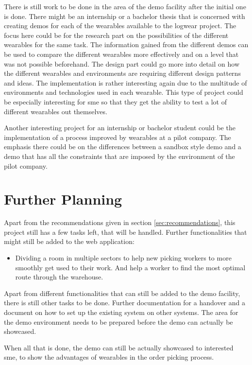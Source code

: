 There is still work to be done in the area of the demo facility after the initial one is done. There might be an internship or a bachelor thesis that is concerned with creating demos for each of the wearables available to the logwear project. The focus here could be for the research part on the possibilities of the different wearables for the same task. The information gained from the different demos can be used to compare the different wearables more effectively and on a level that was not possible beforehand. The design part could go more into detail on how the different wearables and environments are requiring different design patterns and ideas. The implementation is rather interesting again due to the multitude of environments and technologies used in each wearable. This type of project could be especially interesting for \gls{sme} so that they get the ability to test a lot of different wearables out themselves.

Another interesting project for an internship or bachelor student could be the implementation of a process improved by wearables at a pilot company. The emphasis there could be on the differences between a sandbox style demo and a demo that has all the constraints that are imposed by the environment of the pilot company.


\section{Further Planning}
Apart from the recommendations given in section \ref{sec:recommendations}, this project still has a few tasks left, that will be handled. Further functionalities that might still be added to the web application:

\begin{itemize}
	\item Dividing a room in multiple sectors to help new picking workers to more smoothly get used to their work. And help a worker to find the most optimal route through the warehouse.
\end{itemize}

Apart from different functionalities that can still be added to the demo facility, there is still other tasks to be done. Further documentation for a handover and a document on how to set up the existing system on other systems. The area for the demo environment needs to be prepared before the demo can actually be showcased.

When all that is done, the demo can still be actually showcased to interested \gls{sme}, to show the advantages of wearables in the order picking process.
